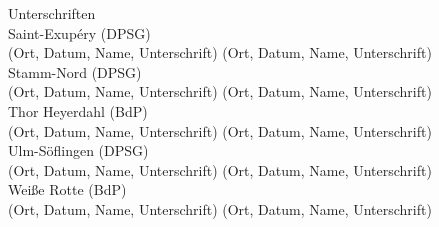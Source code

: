Unterschriften
\\

Saint-Exupéry (DPSG)
\\
(Ort, Datum, Name, Unterschrift) (Ort, Datum, Name, Unterschrift)
\\

Stamm-Nord (DPSG)
\\
(Ort, Datum, Name, Unterschrift) (Ort, Datum, Name, Unterschrift)
\\

Thor Heyerdahl (BdP)
\\
(Ort, Datum, Name, Unterschrift) (Ort, Datum, Name, Unterschrift)
\\

Ulm-Söflingen (DPSG)
\\
(Ort, Datum, Name, Unterschrift) (Ort, Datum, Name, Unterschrift)
\\

Weiße Rotte (BdP)
\\
(Ort, Datum, Name, Unterschrift) (Ort, Datum, Name, Unterschrift)
